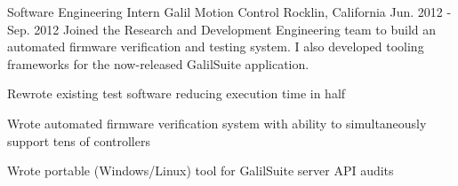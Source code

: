 \begin{cventries}
\cventry
    {Software Engineering Intern} %
    {Galil Motion Control} %
    {Rocklin, California} %
    {Jun. 2012 - Sep. 2012} %
    {Joined the Research and Development Engineering team to build an automated firmware verification and testing system. I also developed tooling frameworks for the now-released GalilSuite application.} %
    {
      \begin{cvitems} %
        \item {Rewrote existing test software reducing execution time in half}
        \item {Wrote automated firmware verification system with ability to simultaneously support tens of controllers}
        \item {Wrote portable (Windows/Linux) tool for GalilSuite server API audits}
      \end{cvitems}
    }

\end{cventries}
